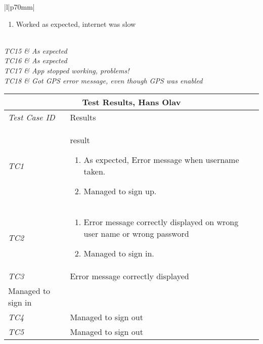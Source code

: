 \begin{minipage}{\linewidth}
\begin{tabular}{ |l|p{70mm}| }
\begin{enumerate}[label=\alph*)]
	                                 \item Worked as expected, internet was slow
	                               \end{enumerate}\\ \hline
	\it{TC15} & As expected \\ \hline
	\it{TC16} & As expected \\ \hline
	\it{TC17} & App stopped working, problems! \\ \hline
	\it{TC18} & Got GPS error message, even though GPS was enabled \\ \hline
\end{tabular}
\medskip
\end{minipage}
%
\begin{minipage}{\linewidth}
\setlength{\tabcolsep}{15pt}
\centering
{}
\begin{tabular}{ |l|p{70mm}| }
	\hline
	\multicolumn{2}{|c|}{\cellcolor{gray!25} \textbf{Test Results, Hans Olav}} \\
	\hline
	\it{\cellcolor{gray!25}Test Case ID} & {\cellcolor{gray!25} Results } \\
	\hline
	\it{\cellcolor{gray!25}TC1} & result \begin{enumerate}[label=\alph*)]
	                                       \item As expected, Error message when username taken.
	                                       \item Managed to sign up.
	                                     \end{enumerate}\\ \hline
	\it{\cellcolor{gray!25}TC2} & \begin{enumerate}[label=\alph*)]
	                                \item Error message correctly displayed on wrong user name or wrong password
	                                \item Managed to sign in.
	                              \end{enumerate}\\ \hline
	\it{\cellcolor{gray!25}TC3} & Error message correctly displayed
\\ Managed to sign in \\ \hline
	\it{\cellcolor{gray!25}TC4} & Managed to sign out \\ \hline
	\it{\cellcolor{gray!25}TC5} & Managed to sign out \\ \hline

\end{tabular}
\end{minipage}
